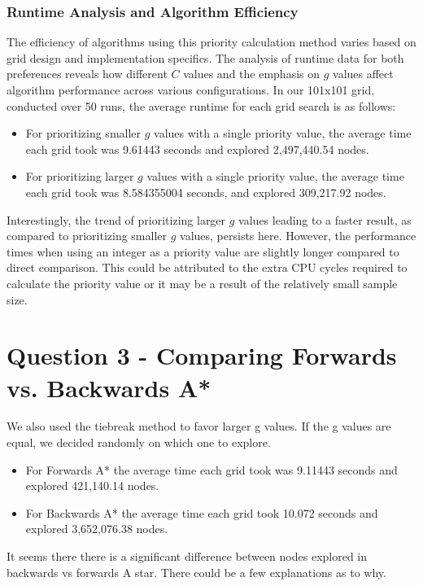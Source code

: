 \documentclass{article}
\begin{document}
\subsubsection{Runtime Analysis and Algorithm Efficiency}
The efficiency of algorithms using this priority calculation method varies based on grid design and implementation specifics. The analysis of runtime data for both preferences reveals how different \(C\) values and the emphasis on \(g\) values affect algorithm performance across various configurations. In our 101x101 grid, conducted over 50 runs, the average runtime for each grid search is as follows:
\begin{itemize}
    \item For prioritizing smaller \(g\) values with a single priority value, the average time each grid took was 9.61443 seconds and explored 2,497,440.54 nodes.
    \item For prioritizing larger \(g\) values with a single priority value, the average time each grid took was 8.584355004 seconds, and explored 309,217.92 nodes.
\end{itemize}
Interestingly, the trend of prioritizing larger \(g\) values leading to a faster result, as compared to prioritizing smaller \(g\) values, persists here. However, the performance times when using an integer as a priority value are slightly longer compared to direct comparison. This could be attributed to the extra CPU cycles required to calculate the priority value or it may be a result of the relatively small sample size. 




\section{Question 3 - Comparing Forwards vs. Backwards A*}
We also used the tiebreak method to favor larger g values. If the g values are equal, we decided randomly on which one to explore. 

\begin{itemize}
    \item For Forwards A* the average time each grid took was 9.11443 seconds and explored 421,140.14 nodes.
    \item For Backwards A* the average time each grid took 10.072 seconds and explored 3,652,076.38 nodes. 
\end{itemize}

It seems there there is a significant difference between nodes explored in backwards vs forwards A star. There could be a few explanations as to why. 
\end{document}
